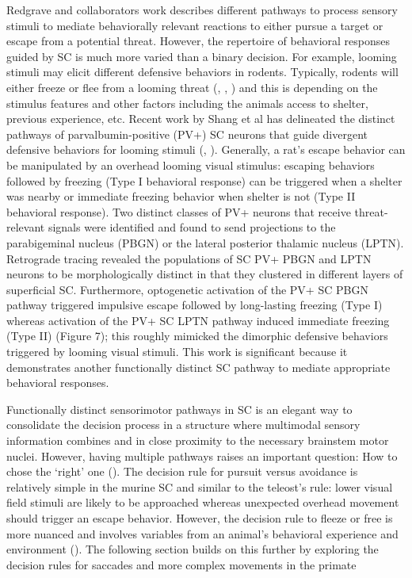 \documentclass{ar-1col}
\begin{document}
{Redgrave and collaborators work describes different pathways to process sensory stimuli to mediate behaviorally relevant reactions to either pursue a target or escape from a potential threat. However, the repertoire of behavioral responses guided by SC is much more varied than a binary decision. For example, looming stimuli may elicit different defensive behaviors in rodents. Typically, rodents will either freeze or flee from a looming threat (\cite{eilam2005hard}, \cite{yilmaz2013rapid}, \cite{de2016vision}) and this is depending on the stimulus features and other factors including the animals access to shelter, previous experience, etc. Recent work by Shang et al has delineated the distinct pathways of parvalbumin-positive (PV+) SC neurons that guide divergent defensive behaviors for looming stimuli (\cite{shang2015parvalbumin}, \cite{shang2018divergent}). Generally, a rat’s escape behavior can be manipulated by an overhead looming visual stimulus: escaping behaviors followed by freezing (Type I behavioral response) can be triggered when a shelter was nearby or immediate freezing behavior when shelter is not (Type II behavioral response). Two distinct classes of PV+ neurons that receive threat-relevant signals were identified and found to send projections to the parabigeminal nucleus (PBGN) or the lateral posterior thalamic nucleus (LPTN). Retrograde tracing revealed the populations of SC PV+ PBGN and LPTN neurons to be morphologically distinct in that they clustered in different layers of superficial SC. Furthermore, optogenetic activation of the PV+ SC PBGN pathway triggered impulsive escape followed by long-lasting freezing (Type I) whereas activation of the PV+ SC LPTN pathway induced immediate freezing (Type II) (Figure 7); this roughly mimicked the dimorphic defensive behaviors triggered by looming visual stimuli. This work is significant because it demonstrates another functionally distinct SC pathway to mediate appropriate behavioral responses.

Functionally distinct sensorimotor pathways in SC is an elegant way to consolidate the decision process in a structure where multimodal sensory information combines and in close proximity to the necessary brainstem motor nuclei. However, having multiple pathways raises an important question: How to chose the ‘right’ one (\cite{redgrave1999basal}). The decision rule for pursuit versus avoidance is relatively simple in the murine SC and similar to the teleost’s rule: lower visual field stimuli are likely to be approached whereas unexpected overhead movement should trigger an escape behavior. However, the decision rule to fleeze or free is more nuanced and involves variables from an animal’s behavioral experience and environment (\cite{eilam2005hard}). The following section builds on this further by exploring the decision rules for saccades and more complex movements in the primate

}
\end{document}

